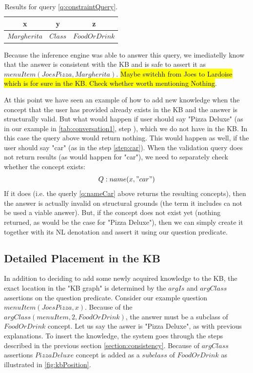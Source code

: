 \begin{table}[H]
\centering
\caption{Results for query \ref{q:constraintQuery}.}
\label{tab:constraintResults}
\begin{tabular}{|c|c|c|}
	\hline
	\textbf{x} & \textbf{y} & \textbf{z} \\
    \hline
    $Margherita$ & $Class$ & $FoodOrDrink$ \\
    \hline
\end{tabular}
\end{table}
Because the inference engine was able to answer this query, we imediatelly
know that the answer is consistent with the KB and is safe to assert it as 
$menuItem(JoesPizza,Margherita)$. 
\hl{Maybe switchh from Joes to
Lardoise which is for sure in the KB. Check whether worth mentioning Nothing}.

At this point we have seen an example of how to add new knowledge when the
concept that the user has provided already exists in the KB and the answer is 
structurally valid. But what would happen if user should say "Pizza Deluxe" 
(as in our example in \autoref{tab:conversation1}, step 
), which we do not have in the KB. In this case the query
above would return nothing. This would happen as well, if the user should say 
"car" (as in the step \ref{step:car}). When the validation query does not return
results (as would happen for "car"), we need to separately check whether the 
concept exists:
\begin{equation}\label{q:nameCar}
Q:name(x,"car")
\end{equation}
If it does (i.e. the querly \ref{q:nameCar} above returns the resulting 
concepts), then the answer is actually invalid on structural grounds (the term 
it includes ca not be used a viable answer).
But, if the concept does not exist yet (nothing returned, as would be the case 
for "Pizza Deluxe"), then we can simply create it together with its NL 
denotation and assert it using our question predicate.

\subsection{Detailed Placement in the KB}
\label{section:placement}
In addition to deciding to add some newly acquired knowledge to the KB, the 
exact location in the "KB graph" is determined by the $argIs$ and $argClass$
assertions on the question predicate. Consider our example question
$menuItem(JoesPizza,x)$. Because of the $argClass(menuItem,2,FoodOrDrink)$, the
answer must be a subclass of $FoodOrDrink$ concept. Let us say the aswer is
"Pizza Deluxe", as with previous explanations. To insert the knowledge, the 
system goes through the steps described in the previous section 
\ref{section:consistency}. Because of $argClass$ assertions $PizzaDeluxe$ 
concept is added as a $subclass$ of $FoodOrDrink$ as illustrated in 
\autoref{fig:kbPosition}.

